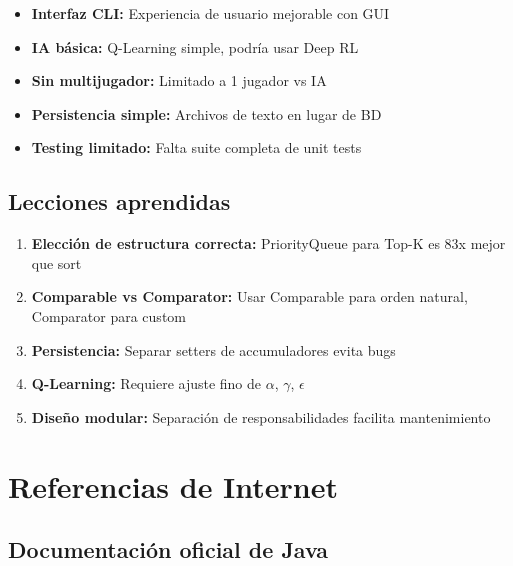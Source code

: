 \documentclass[12pt,a4paper]{article}
\begin{document}
\begin{itemize}
    \item \textbf{Interfaz CLI:} Experiencia de usuario mejorable con GUI
    \item \textbf{IA básica:} Q-Learning simple, podría usar Deep RL
    \item \textbf{Sin multijugador:} Limitado a 1 jugador vs IA
    \item \textbf{Persistencia simple:} Archivos de texto en lugar de BD
    \item \textbf{Testing limitado:} Falta suite completa de unit tests
\end{itemize}

\subsection{Lecciones aprendidas}

\begin{enumerate}
    \item \textbf{Elección de estructura correcta:} PriorityQueue para Top-K es 83x mejor que sort
    \item \textbf{Comparable vs Comparator:} Usar Comparable para orden natural, Comparator para custom
    \item \textbf{Persistencia:} Separar setters de accumuladores evita bugs
    \item \textbf{Q-Learning:} Requiere ajuste fino de $\alpha$, $\gamma$, $\epsilon$
    \item \textbf{Diseño modular:} Separación de responsabilidades facilita mantenimiento
\end{enumerate}

\newpage

\section{Referencias de Internet}

\subsection{Documentación oficial de Java}
\end{document}
